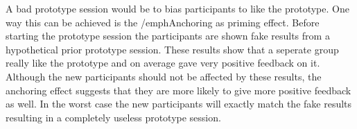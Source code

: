 \documentclass[Main.tex]{subfiles}
\begin{document}
A bad prototype session would be to bias participants to like the prototype. One way this can be achieved is the /emph{Anchoring as priming effect}. Before starting the prototype session the participants are shown fake results from a hypothetical prior prototype session. These results show that a seperate group really like the prototype and on average gave very positive feedback on it. Although the new participants should not be affected by these results, the anchoring effect suggests that they are more likely to give more positive feedback as well. In the worst case the new participants will exactly match the fake results resulting in a completely useless prototype session.
\end{document}
